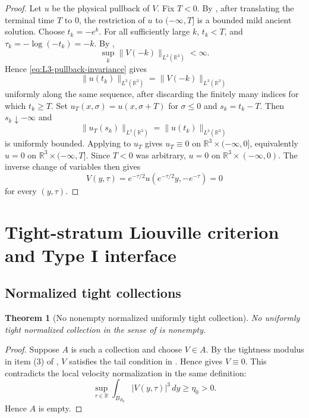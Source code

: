 \documentclass[11pt]{amsart}
\theoremstyle{plain}
\newtheorem{theorem}{Theorem}[section]
\theoremstyle{definition}
\theoremstyle{remark}
\numberwithin{equation}{section}
\newcommand{\R}{\mathbb R}
\begin{document}
\begin{proof}
Let \(u\) be the physical pullback of \(V\).  Fix \(T<0\).  By
, after translating the terminal time \(T\) to \(0\),
the restriction of \(u\) to \((-\infty,T]\) is a bounded mild ancient
solution.  Choose \(t_k=-e^k\).  For all sufficiently large \(k\), \(t_k<T\),
and \(\tau_k=-\log(-t_k)=-k\).  By
,
\[
   \sup_k\|V(-k)\|_{L^3(\R^3)}<\infty .
\]
Hence \eqref{eq:L3-pullback-invariance} gives
\[
   \|u(t_k)\|_{L^3(\R^3)}
   =
   \|V(-k)\|_{L^3(\R^3)}
\]
uniformly along the same sequence, after discarding the finitely many indices
for which \(t_k\ge T\).
Set \(u_T(x,\sigma)=u(x,\sigma+T)\) for \(\sigma\le0\) and
\(s_k=t_k-T\).  Then \(s_k\downarrow-\infty\) and
\[
   \|u_T(s_k)\|_{L^3(\R^3)}
   =
   \|u(t_k)\|_{L^3(\R^3)}
\]
is uniformly bounded.  Applying  to \(u_T\) gives
\(u_T\equiv0\) on \(\R^3\times(-\infty,0]\), equivalently \(u=0\) on
\(\R^3\times(-\infty,T]\).  Since \(T<0\) was arbitrary, \(u=0\) on
\(\R^3\times(-\infty,0)\).  The inverse change of variables then gives
\[
   V(y,\tau)=e^{-\tau/2}u(e^{-\tau/2}y,-e^{-\tau})=0
\]
for every \((y,\tau)\).
\end{proof}

\section{Tight-stratum Liouville criterion and Type I interface}
\label{sec:tight-liouville-interface}

\subsection{Normalized tight collections}

\begin{theorem}[No nonempty normalized uniformly tight collection]
\label{thm:no-tight-normalized-collection}
No uniformly tight normalized collection in the sense of
 is nonempty.
\end{theorem}

\begin{proof}
Suppose \(A\) is such a collection and choose \(V\in A\).  By the tightness
modulus in item \textup{(3)} of , \(V\)
satisfies the tail condition in .  Hence
 gives \(V\equiv0\).  This contradicts the local
velocity normalization in the same definition:
\[
   \sup_{\tau\in\R}
   \int_{B_{R_0}}|V(y,\tau)|^3\,dy\ge\eta_0>0 .
\]
Hence \(A\) is empty.
\end{proof}
\end{document}
